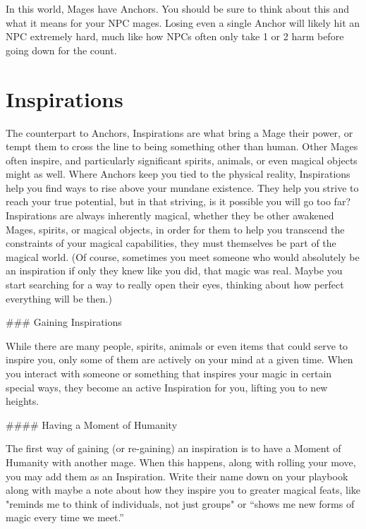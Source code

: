\documentclass[
  oneside,
  statementpaper,
  9pt]{memoir}
\begin{document}
\begin{MC}

In this world, Mages have Anchors. You should be sure to think about this and what it means for your NPC mages. Losing even a single Anchor will likely hit an NPC extremely hard, much like how NPCs often only take 1 or 2 harm before going down for the count. 

\end{MC}

\hypertarget{inspirations}{%
\section{Inspirations}\label{inspirations}}

\begin{Player}

The counterpart to Anchors, Inspirations are what bring a Mage their power, or tempt them to cross the line to being something other than human. Other Mages often inspire, and particularly significant spirits, animals, or even magical objects might as well. Where Anchors keep you tied to the physical reality, Inspirations help you find ways to rise above your mundane existence. They help you strive to reach your true potential, but in that striving, is it possible you will go too far? Inspirations are always inherently magical, whether they be other awakened Mages, spirits, or magical objects, in order for them to help you transcend the constraints of your magical capabilities, they must themselves be part of the magical world. (Of course, sometimes you meet someone who would absolutely be an inspiration if only they knew like you did, that magic was real. Maybe you start searching for a way to really open their eyes, thinking about how perfect everything will be then.)

### Gaining Inspirations

While there are many people, spirits, animals or even items that could serve to inspire you, only some of them are actively on your mind at a given time. When you interact with someone or something that inspires your magic in certain special ways, they become an active Inspiration for you, lifting you to new heights. 

#### Having a Moment of Humanity

The first way of gaining (or re-gaining) an inspiration is to have a Moment of Humanity with another mage. When this happens, along with rolling your move, you may add them as an Inspiration. Write their name down on your playbook along with maybe a note about how they inspire you to greater magical feats, like "reminds me to think of individuals, not just groups" or “shows me new forms of magic every time we meet.”


\end{Player}
\end{document}
